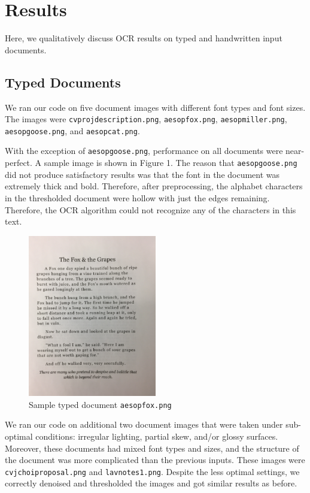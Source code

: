 \documentclass[11pt,letterpaper]{article}
\begin{document}
\section{Results}

Here, we qualitatively discuss OCR results on typed and handwritten input documents.

\subsection{Typed Documents}

We ran our code on five document images with different font types and font sizes. The images were {\tt cv\textunderscore proj\textunderscore description.png}, {\tt aesop\textunderscore fox.png}, {\tt aesop\textunderscore miller.png}, {\tt aesop\textunderscore goose.png}, and {\tt aesop\textunderscore cat.png}.

With the exception of {\tt aesop\textunderscore goose.png}, performance on all documents were near-perfect. A sample image is shown in Figure 1. The reason that {\tt aesop\textunderscore goose.png} did not produce satisfactory results was that the font in the document was extremely thick and bold. Therefore, after preprocessing, the alphabet characters in the thresholded document were hollow with just the edges remaining. Therefore, the OCR algorithm could not recognize any of the characters in this text.

\begin{figure}[t!]
  \centering
  \includegraphics[keepaspectratio, width=0.5\textwidth]{fox.png}
  \caption{Sample typed document {\tt aesop\textunderscore fox.png}}
\end{figure}

We ran our code on additional two document images that were taken under sub-optimal conditions: irregular lighting, partial skew, and/or glossy surfaces. Moreover, these documents had mixed font types and sizes, and the structure of the document was more complicated than the previous inputs. These images were {\tt cv\textunderscore jchoi\textunderscore proposal.png} and {\tt lav\textunderscore notes1.png}. Despite the less optimal settings, we correctly denoised and thresholded the images and got similar results as before.
\end{document}
